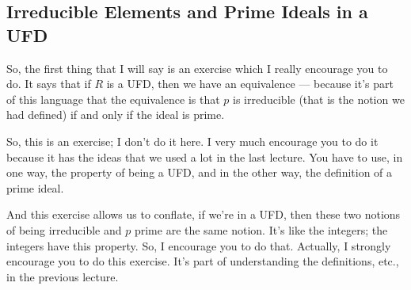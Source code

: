 \subsection{Irreducible Elements and Prime Ideals in a UFD}

\begin{speech}[00:00:41 - 00:01:51]
So, the first thing that I will say is an exercise which I really encourage you to do. It says that if $R$ is a UFD, then we have an equivalence --- because it's part of this language that the equivalence is that $p$ is irreducible (that is the notion we had defined) if and only if the ideal is prime. 

So, this is an exercise; I don't do it here. I very much encourage you to do it because it has the ideas that we used a lot in the last lecture. You have to use, in one way, the property of being a UFD, and in the other way, the definition of a prime ideal.

And this exercise allows us to conflate, if we're in a UFD, then these two notions of being irreducible and $p$ prime are the same notion. It's like the integers; the integers have this property. So, I encourage you to do that. Actually, I strongly encourage you to do this exercise. It's part of understanding the definitions, etc., in the previous lecture.
\end{speech}

